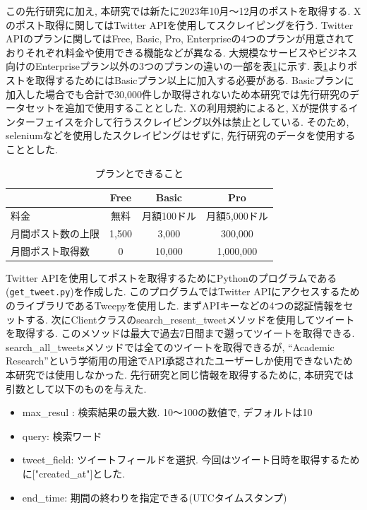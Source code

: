 この先行研究に加え, 本研究では新たに2023年10月〜12月のポストを取得する. Xのポスト取得に関してはTwitter APIを使用してスクレイピングを行う. Twitter APIのプランに関してはFree, Basic, Pro, Enterpriseの4つのプランが用意されておりそれぞれ料金や使用できる機能などが異なる. 大規模なサービスやビジネス向けのEnterpriseプラン以外の3つのプランの違いの一部を表\ref{tb:xplan}に示す. 
表\ref{tb:xplan}よりポストを取得するためにはBasicプラン以上に加入する必要がある. Basicプランに加入した場合でも合計で30,000件しか取得されないため本研究では先行研究のデータセットを追加で使用することとした. Xの利用規約によると, Xが提供するインターフェイスを介して行うスクレイピング以外は禁止としている. そのため, seleniumなどを使用したスクレイピングはせずに, 先行研究のデータを使用することとした. 

\begin{table}[htbp]
  \caption{プランとできること}
  \label{tb:xplan}
  \begin{center}
  \begin{tabular}{|l|c|c|c|}
    \hline
    &Free&Basic&Pro \\\hline\hline
    料金&無料&月額100ドル&月額5,000ドル \\\hline
    月間ポスト数の上限&1,500&3,000&300,000 \\\hline
    月間ポスト取得数&0&10,000&1,000,000 \\\hline
  \end{tabular}\end{center}
\end{table}

Twitter APIを使用してポストを取得するためにPythonのプログラムである(\verb|get_tweet.py|)を作成した. このプログラムではTwitter APIにアクセスするためのライブラリであるTweepy\cite{tweepy}を使用した. まずAPIキーなどの4つの認証情報をセットする. 次にClientクラスのsearch\_resent\_tweetメソッドを使用してツイートを取得する. 
このメソッドは最大で過去7日間まで遡ってツイートを取得できる. search\_all\_tweetsメソッドでは全てのツイートを取得できるが, ``Academic Research''という学術用の用途でAPI承認されたユーザーしか使用できないため本研究では使用しなかった. 
先行研究と同じ情報を取得するために, 本研究では引数として以下のものを与えた. 
\begin{itemize}
 \item max\_resul : 検索結果の最大数. 10〜100の数値で, デフォルトは10
 \item query: 検索ワード
 \item tweet\_field: ツイートフィールドを選択. 今回はツイート日時を取得するために["created\_at"]とした. 
 \item end\_time: 期間の終わりを指定できる(UTCタイムスタンプ)
\end{itemize}

